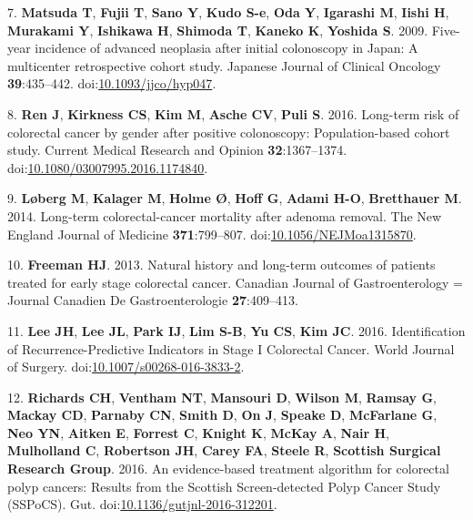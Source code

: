 \documentclass[12pt,]{article}
\begin{document}
\hypertarget{ref-matsuda_five-year_2009}{}
7. \textbf{Matsuda T}, \textbf{Fujii T}, \textbf{Sano Y}, \textbf{Kudo
S-e}, \textbf{Oda Y}, \textbf{Igarashi M}, \textbf{Iishi H},
\textbf{Murakami Y}, \textbf{Ishikawa H}, \textbf{Shimoda T},
\textbf{Kaneko K}, \textbf{Yoshida S}. 2009. Five-year incidence of
advanced neoplasia after initial colonoscopy in Japan: A multicenter
retrospective cohort study. Japanese Journal of Clinical Oncology
\textbf{39}:435--442.
doi:\href{https://doi.org/10.1093/jjco/hyp047}{10.1093/jjco/hyp047}.

\hypertarget{ref-ren_long-term_2016}{}
8. \textbf{Ren J}, \textbf{Kirkness CS}, \textbf{Kim M}, \textbf{Asche
CV}, \textbf{Puli S}. 2016. Long-term risk of colorectal cancer by
gender after positive colonoscopy: Population-based cohort study.
Current Medical Research and Opinion \textbf{32}:1367--1374.
doi:\href{https://doi.org/10.1080/03007995.2016.1174840}{10.1080/03007995.2016.1174840}.

\hypertarget{ref-loberg_long-term_2014}{}
9. \textbf{Løberg M}, \textbf{Kalager M}, \textbf{Holme Ø}, \textbf{Hoff
G}, \textbf{Adami H-O}, \textbf{Bretthauer M}. 2014. Long-term
colorectal-cancer mortality after adenoma removal. The New England
Journal of Medicine \textbf{371}:799--807.
doi:\href{https://doi.org/10.1056/NEJMoa1315870}{10.1056/NEJMoa1315870}.

\hypertarget{ref-freeman_natural_2013}{}
10. \textbf{Freeman HJ}. 2013. Natural history and long-term outcomes of
patients treated for early stage colorectal cancer. Canadian Journal of
Gastroenterology = Journal Canadien De Gastroenterologie
\textbf{27}:409--413.

\hypertarget{ref-lee_identification_2016}{}
11. \textbf{Lee JH}, \textbf{Lee JL}, \textbf{Park IJ}, \textbf{Lim
S-B}, \textbf{Yu CS}, \textbf{Kim JC}. 2016. Identification of
Recurrence-Predictive Indicators in Stage I Colorectal Cancer. World
Journal of Surgery.
doi:\href{https://doi.org/10.1007/s00268-016-3833-2}{10.1007/s00268-016-3833-2}.

\hypertarget{ref-richards_evidence-based_2016}{}
12. \textbf{Richards CH}, \textbf{Ventham NT}, \textbf{Mansouri D},
\textbf{Wilson M}, \textbf{Ramsay G}, \textbf{Mackay CD},
\textbf{Parnaby CN}, \textbf{Smith D}, \textbf{On J}, \textbf{Speake D},
\textbf{McFarlane G}, \textbf{Neo YN}, \textbf{Aitken E},
\textbf{Forrest C}, \textbf{Knight K}, \textbf{McKay A}, \textbf{Nair
H}, \textbf{Mulholland C}, \textbf{Robertson JH}, \textbf{Carey FA},
\textbf{Steele R}, \textbf{Scottish Surgical Research Group}. 2016. An
evidence-based treatment algorithm for colorectal polyp cancers: Results
from the Scottish Screen-detected Polyp Cancer Study (SSPoCS). Gut.
doi:\href{https://doi.org/10.1136/gutjnl-2016-312201}{10.1136/gutjnl-2016-312201}.
\end{document}
